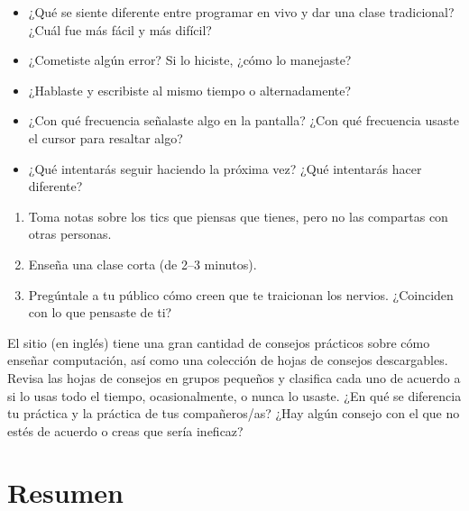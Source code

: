 \begin{itemize}

\item
  ¿Qué se siente diferente entre programar en vivo y dar una clase tradicional?
  ¿Cuál fue más fácil y más difícil?

\item
  ¿Cometiste algún error?
  Si lo hiciste, ¿cómo lo manejaste?

\item
  ¿Hablaste y escribiste al mismo tiempo o alternadamente?

\item
  ¿Con qué frecuencia señalaste algo en la pantalla?
  ¿Con qué frecuencia usaste el cursor para resaltar algo?

\item
  ¿Qué intentarás seguir haciendo la próxima vez?
  ¿Qué intentarás hacer diferente?

\end{itemize}


\begin{enumerate}

\item
  Toma notas sobre los tics que piensas que tienes,
  pero no las compartas con otras personas.

\item
  Enseña una clase corta (de 2--3 minutos).

\item
  Pregúntale a tu público cómo creen que te traicionan los nervios.
  ¿Coinciden con lo que pensaste de ti?

\end{enumerate}


El sitio  (en inglés)
tiene una gran cantidad de consejos prácticos sobre cómo enseñar computación,
así como una colección de hojas de consejos descargables.
Revisa las hojas de consejos en grupos pequeños y clasifica cada uno
de acuerdo a si lo usas todo el tiempo,
ocasionalmente,
o nunca lo usaste.
¿En qué se diferencia tu práctica y la práctica de tus compañeros/as?
¿Hay algún consejo con el que no estés de acuerdo o creas que sería ineficaz?

\section*{Resumen}

